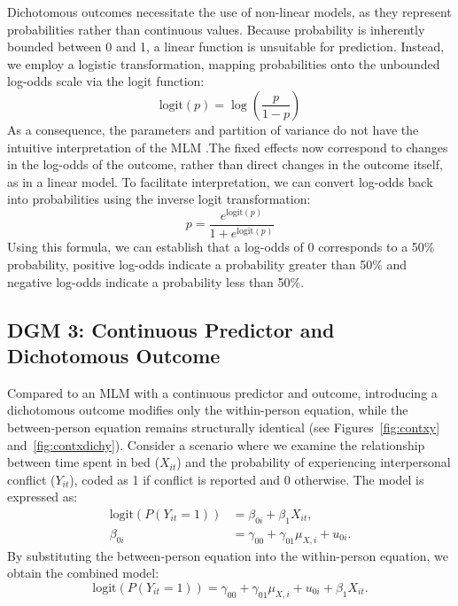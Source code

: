 \documentclass[stu]{apa7}
\begin{document}
Dichotomous outcomes necessitate the use of non-linear models, as they represent probabilities rather than continuous values. Because probability is inherently bounded between 0 and 1, a linear function is unsuitable for prediction. Instead, we employ a logistic transformation, mapping probabilities onto the unbounded log-odds scale via the logit function:
\begin{equation}
    \text{logit}(p) = \log\left(\frac{p}{1 - p}\right)
\end{equation}
As a consequence, the parameters and partition of variance do not have the intuitive interpretation of the MLM \parencite{merlo_brief_2006}.The fixed effects now correspond to changes in the log-odds of the outcome, rather than direct changes in the outcome itself, as in a linear model. To facilitate interpretation, we can convert log-odds back into probabilities using the inverse logit transformation:
\[
p = \frac{e^{\text{logit}(p)}}{1 + e^{\text{logit}(p)}}
\]
Using this formula, we can establish that a log-odds of 0 corresponds to a 50\% probability, positive log-odds indicate a probability greater than 50\% and negative log-odds indicate a probability less than 50\%.

\subsection{DGM 3: Continuous Predictor and Dichotomous Outcome}

Compared to an MLM with a continuous predictor and outcome, introducing a dichotomous outcome modifies only the within-person equation, while the between-person equation remains structurally identical (see Figures~\ref{fig:contxy} and~\ref{fig:contxdichy}). Consider a scenario where we examine the relationship between time spent in bed (\(X_{it}\)) and the probability of experiencing interpersonal conflict (\(Y_{it}\)), coded as 1 if conflict is reported and 0 otherwise. The model is expressed as:
\begin{align}
\label{eqn:logityit-cont}
\text{logit}(P(Y_{it} = 1)) &= \beta_{0i} + \beta_1 X_{it}, \\
\label{eqn:beta0-cont}
\beta_{0i} &= \gamma_{00} + \gamma_{01} \mu_{X,i} + u_{0i}.
\end{align}
By substituting the between-person equation into the within-person equation, we obtain the combined model:
\begin{equation}
\text{logit}(P(Y_{it} = 1)) = \gamma_{00} + \gamma_{01} \mu_{X,i} + u_{0i} + \beta_1 X_{it}.
\end{equation}
\end{document}
